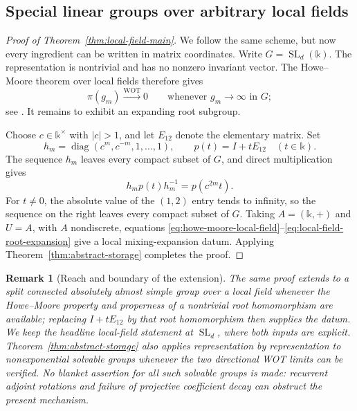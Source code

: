 \documentclass[10pt,a4paper]{amsart}
\numberwithin{equation}{section}
\newtheorem{remark}[theorem]{Remark}
\begin{document}
\subsection{Special linear groups over arbitrary local fields}

\begin{proof}[Proof of Theorem~\ref{thm:local-field-main}]
We follow the same scheme, but now every ingredient can be written in matrix
coordinates.  Write $G=\operatorname{SL}_d(\mathbb k)$.  The representation is nontrivial
and has no nonzero invariant vector.  The Howe--Moore theorem over local
fields therefore gives
\begin{equation}\label{eq:howe-moore-local-field}
 \pi(g_m)\xrightarrow{\mathrm{WOT}}0
 \qquad\text{whenever }g_m\longrightarrow\infty\text{ in }G;
\end{equation}
see \cite{HoweMoore1979,Ciobotaru2014}.  It remains to exhibit an expanding
root subgroup.

Choose $c\in\mathbb k^\times$ with $|c|>1$, and let $E_{12}$ denote the
elementary matrix.  Set
\begin{equation}\label{eq:local-field-expanding-pair}
 h_m=\operatorname{diag}(c^m,c^{-m},1,\ldots,1),
 \qquad p(t)=I+tE_{12}\quad(t\in\mathbb k).
\end{equation}
The sequence $h_m$ leaves every compact subset of $G$, and direct
multiplication gives
\begin{equation}\label{eq:local-field-root-expansion}
 h_mp(t)h_m^{-1}=p(c^{2m}t).
\end{equation}
For $t\neq0$, the absolute value of the $(1,2)$ entry tends to infinity, so
the sequence on the right leaves every compact subset of $G$.  Taking
$A=(\mathbb k,+)$ and $U=A$, with $A$ nondiscrete, equations
\eqref{eq:howe-moore-local-field}--\eqref{eq:local-field-root-expansion}
give a local mixing-expansion datum.  Applying
Theorem~\ref{thm:abstract-storage} completes the proof.
\end{proof}

\begin{remark}[Reach and boundary of the extension]
The same proof extends to a split connected absolutely almost simple group
over a local field whenever the Howe--Moore property and properness of a
nontrivial root homomorphism are available; replacing $I+tE_{12}$ by that
root homomorphism then supplies the datum.  We keep the headline local-field
statement at $\operatorname{SL}_d$, where both inputs are explicit.
Theorem~\ref{thm:abstract-storage} also applies
representation by representation to nonexponential solvable groups whenever
the two directional WOT limits can be verified.  No blanket assertion for all
such solvable groups is made: recurrent adjoint rotations and failure of
projective coefficient decay can obstruct the present mechanism.
\end{remark}
\end{document}
